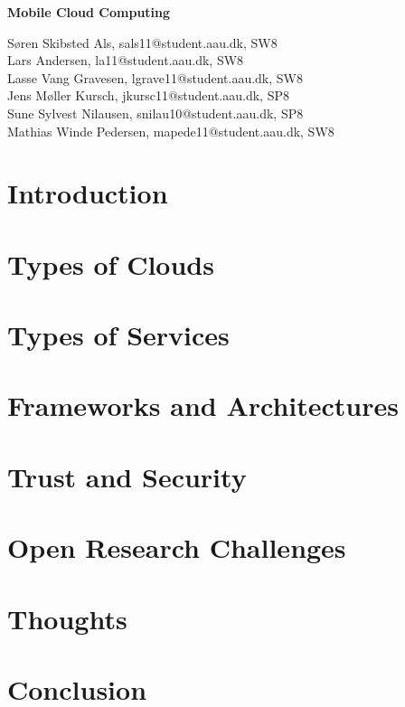 \documentclass[12pt,a4paper]{article}
\begin{document}
\begin{center}
\bigskip\bigskip
{\Large\bf Mobile Cloud Computing\\}
\bigskip\bigskip


Søren Skibsted Als, sals11@student.aau.dk, SW8\\
Lars Andersen, la11@student.aau.dk, SW8\\
Lasse Vang Gravesen, lgrave11@student.aau.dk, SW8\\
Jens Møller Kursch, jkursc11@student.aau.dk, SP8\\
Sune Sylvest Nilausen, snilau10@student.aau.dk, SP8\\
Mathias Winde Pedersen, mapede11@student.aau.dk, SW8


\bigskip
\begin{abstract}

\end{abstract}

\thispagestyle{empty}
\end{center}


\titlepage

\thispagestyle{plain}


\section{Introduction}


\section{Types of Clouds}

\section{Types of Services}

\section{Frameworks and Architectures}

\section{Trust and Security}

\section{Open Research Challenges}

\section{Thoughts}

\section{Conclusion}

\newpage


\label{bib:mybiblio}
\end{document}
